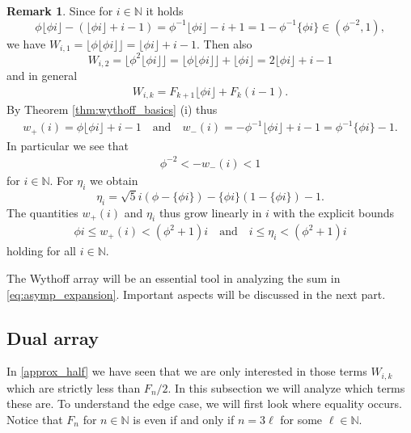 \documentclass[]{interact}
\newcommand{\bbN}{\mathbb{N}}
\theoremstyle{definition}
\newtheorem{rem}[thm]{Remark}
\numberwithin{table}{section} %
\numberwithin{figure}{section}
\begin{document}
\begin{rem} \label{rem:w_numbers}
    Since for $i \in \bbN$ it holds
    $$
    \phi \lfloor \phi i\rfloor - (\lfloor\phi i \rfloor + i -1 ) = \phi^{-1} \lfloor \phi i\rfloor - i + 1 = 1 - \phi^{-1} \{\phi i\} \in (\phi^{-2}, 1),
    $$
    we have $W_{i, 1} = \lfloor \phi \lfloor \phi i\rfloor\rfloor = \lfloor \phi i \rfloor + i - 1$. Then also
    $$
    W_{i, 2} = \lfloor \phi^2 \lfloor \phi i\rfloor \rfloor = \lfloor \phi \lfloor \phi i\rfloor \rfloor + \lfloor \phi i\rfloor = 2\lfloor \phi i \rfloor + i - 1
    $$
    and in general
    \begin{align} \label{eq:W_fib}
        W_{i, k} = F_{k+1} \lfloor \phi i\rfloor + F_{k}(i-1).
    \end{align}
    By Theorem \ref{thm:wythoff_basics} (i) thus
    \begin{align}\label{ineq:wp_wm_expressions}
        w_+(i) = \phi\lfloor\phi i\rfloor + i - 1 \quad \text{and} \quad w_-(i) = -\phi^{-1} \lfloor\phi i\rfloor + i - 1 = \phi^{-1} \{\phi i\} - 1.
    \end{align}
    In particular we see that
    \begin{align} \label{ineq:w_minus}
        \phi^{-2} < -w_-(i) < 1
    \end{align}
    for $i \in \bbN$. For $\eta_i$ we obtain
    $$
    \eta_i = \sqrt5 i (\phi - \{\phi i\})-\{\phi i\}(1-\{\phi i\}) - 1.
    $$
    The quantities $w_+(i)$ and $\eta_i$ thus grow linearly in $i$ with the explicit bounds
    \begin{align} \label{lin_growth}
        \phi i \leq w_+(i) < (\phi^2+1)i \quad \text{and} \quad i \leq \eta_i < (\phi^2+1) i
    \end{align}
    holding for all $i \in \bbN$.
\end{rem}

The Wythoff array will be an essential tool in analyzing the sum in \eqref{eq:asymp_expansion}. Important aspects will be discussed in the next part.

\subsection{Dual array}

In \eqref{approx_half} we have seen that we are only interested in those terms $W_{i, k}$ which are strictly less than $F_n/2$. In this subsection we will analyze which terms these are. To understand the edge case, we will first look where equality occurs. Notice that $F_n$ for $n \in \bbN$ is even if and only if $n = 3\ell$ for some $\ell \in \bbN$.
\end{document}
